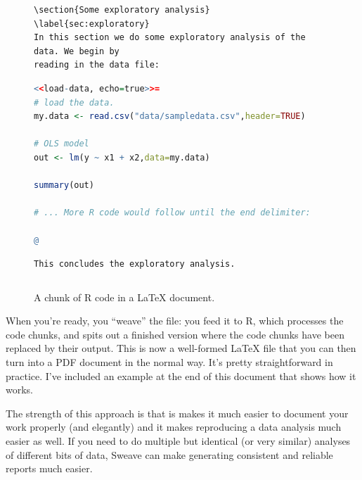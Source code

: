 \documentclass[11pt,article,oneside]{memoir}
\begin{document}
\begin{figure}
\begin{lstlisting}[style=sweave-top]

\end{lstlisting} 
\begin{lstlisting}[language={[latex]tex},numbers=none,style=sweave-tex]   
\section{Some exploratory analysis}
\label{sec:exploratory}
In this section we do some exploratory analysis of the data. We begin by
reading in the data file:
\end{lstlisting}
\begin{lstlisting}[language=R,numbers=none,style=sweave-r] 
<<load-data, echo=true>>=
# load the data. 
my.data <- read.csv("data/sampledata.csv",header=TRUE)

# OLS model
out <- lm(y ~ x1 + x2,data=my.data)

summary(out)

# ... More R code would follow until the end delimiter:

@ 
\end{lstlisting}
\begin{lstlisting}[language={[latex]tex},numbers=none,style=sweave-tex] 
% now we are back to normal latex 
This concludes the exploratory analysis. 
\end{lstlisting} 
\begin{lstlisting}[style=sweave-bottom]

\end{lstlisting}
  \caption{A chunk of R code in a LaTeX document.}
\label{fig:codechunk}
\end{figure}

When you're ready, you ``weave'' the file: you feed it to R, which processes the code chunks, and spits out a finished version where the code chunks have been replaced by their output. This is now a well-formed LaTeX file that you can then turn into a PDF document in the normal way. It's pretty straightforward in practice. I've included an example at the end of this document that shows how it works.

The strength of this approach is that is makes it much easier to document your work properly (and elegantly) and it makes reproducing a data analysis much easier as well. If you need to do multiple but identical (or very similar) analyses of different bits of data, Sweave can make generating consistent and reliable reports much easier.
\end{document}

